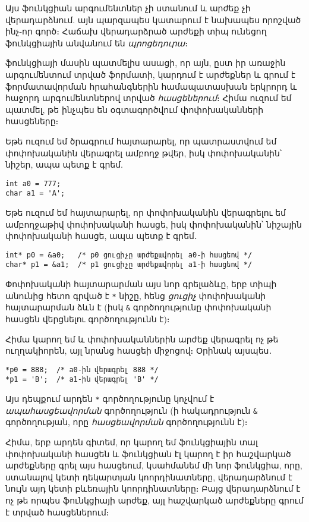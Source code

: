 Այս ֆունկցիան արգումենտներ չի ստանում և արժեք չի վերադարձնում. այն
պարզապես կատարում է նախապես որոշված ինչ-որ գործ։ Հաճախ 
վերադարձրած արժեքի տիպ ունեցող ֆունկցիային անվանում են
\emph{պրոցեդուրա}։

 ֆունկցիայի մասին պատմելիս ասացի, որ այն,
ըստ իր առաջին արգումենտում տրված ֆորմատի, կարդում է արժեքներ և գրում
է ֆորմատավորման հրահանգներին համապատասխան երկրորդ և հաջորդ արգումենտներով
տրված \emph{հասցեներում}։ Հիմա ուզում եմ պատմել,
թե ինչպես են օգտագործվում փոփոխականների հասցեները։

Եթե ուզում եմ ծրագրում հայտարարել, որ պատրաստվում եմ  փոփոխականին
վերագրել ամբողջ թվեր, իսկ  փոփոխականին՝ նիշեր, ապա պետք է գրեմ.

\begin{Verbatim}
int a0 = 777;
char a1 = 'A';
\end{Verbatim}

Եթե ուզում եմ հայտարարել, որ  փոփոխականին վերագրելու եմ ամբողջաթիվ
փոփոխականի հասցե, իսկ  փոփոխականին՝ նիշային փոփոխականի հասցե,
ապա պետք է գրեմ․

\begin{Verbatim}
int* p0 = &a0;   /* p0 ցուցիչը արժեքավորել a0-ի հասցեով */
char* p1 = &a1;  /* p1 ցուցիչը արժեքավորել a1-ի հասցեով */
\end{Verbatim}

Փոփոխականի հայտարարման այս նոր գրելաձևը, երբ տիպի անունից հետո գրված
է \verb|*| նիշը, հենց \emph{ցուցիչ} փոփոխականի հայտարարման ձևն է (իսկ
\verb|&| գործողությունը փոփոխականի հասցեն վերցնելու գործողությունն է)։

Հիմա կարող եմ  և  փոփոխականներին արժեք վերագրել ոչ թե
ուղղակիորեն, այլ նրանց հասցեի միջոցով։ Օրինակ այսպես․

\begin{Verbatim}
*p0 = 888;  /* a0-ին վերագրել 888 */
*p1 = 'B';  /* a1-ին վերագրել 'B' */
\end{Verbatim}

Այս դեպքում արդեն \verb|*| գործողությունը կոչվում է \emph{ապահասցեավորման}
գործողություն (ի հակադրություն \verb|&| գործողության, որը \emph{հասցեավորման}
գործողությունն է)։

Հիմա, երբ արդեն գիտեմ, որ կարող եմ ֆունկցիային տալ փոփոխականի հասցեն և
ֆունկցիան էլ կարող է իր հաշվարկած արժեքները գրել այս հասցեում, կսահմանեմ
մի նոր ֆունկցիա, որը, ստանալով կետի դեկարտյան կոորդինատները, վերադարձնում
է նույն այդ կետի բևեռային կոորդինատները։ Բայց վերադարձնում է ոչ թե որպես
ֆունկցիայի արժեք, այլ հաշվարկած արժեքները գրում է տրված հասցեներում։

